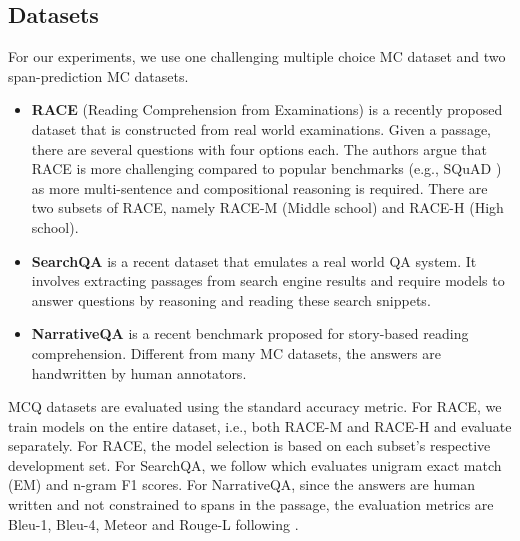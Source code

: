 \documentclass{article}
\begin{document}
\subsection{Datasets}
For our experiments, we use one challenging multiple choice MC dataset and two span-prediction MC datasets.
\begin{itemize}
\item \textbf{RACE} (Reading Comprehension from Examinations) \cite{lai2017race} is a recently proposed dataset that is constructed from real world examinations. Given a passage, there are several questions with four options each. The authors argue that RACE is more challenging compared to popular benchmarks (e.g., SQuAD \cite{rajpurkar2016squad}) as more multi-sentence and compositional reasoning is required. There are two subsets of RACE, namely RACE-M (Middle school) and RACE-H (High school).  
\item \textbf{SearchQA} \cite{dunn2017searchqa} is a recent dataset that emulates a real world QA system. It involves extracting passages from search engine results and require models to answer questions by reasoning and reading these search snippets. 
\item \textbf{NarrativeQA} \cite{kovcisky2017narrativeqa} is a recent benchmark proposed for story-based reading comprehension. Different from many MC datasets, the answers are handwritten by human annotators. 
\end{itemize}


MCQ datasets are evaluated using the standard accuracy metric. For RACE, we train models on the entire dataset, i.e., both RACE-M and RACE-H and evaluate separately. For RACE, the model selection is based on each subset's respective development set. For SearchQA, we follow \cite{kundu2018amanda,dunn2017searchqa} which evaluates unigram exact match (EM) and n-gram F1 scores. For NarrativeQA, since the answers are human written and not constrained to spans in the passage, the evaluation metrics are Bleu-1, Bleu-4, Meteor and Rouge-L following \cite{kovcisky2017narrativeqa}. 
\end{document}
